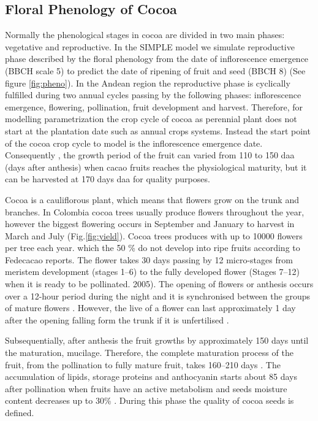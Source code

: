 \documentclass[gene,journal,article,submit,moreauthors,pdftex]{Definitions/mdpi}
\begin{document}
\subsection{Floral Phenology of Cocoa }
Normally the phenological stages in cocoa are  divided in two main phases: vegetative and reproductive. In the SIMPLE model we simulate reproductive phase described by the floral phenology from the date of inflorescence emergence (BBCH scale 5) to predict the date of ripening of fruit and seed (BBCH 8) \citep{Niemenak2010} (See figure \ref{fig:pheno}). In the Andean region the reproductive phase is cyclically fulfilled during two annual cycles passing by the following phases: inflorescence emergence, flowering, pollination, fruit development and harvest. Therefore, for modelling parametrization the crop cycle of cocoa as perennial plant does not start at the plantation date such as annual crops systems. Instead  the start point of the cocoa crop cycle to model is the inflorescence emergence date. Consequently , the growth period of the fruit can varied from  110 to 150  daa (days after anthesis) \citep{lopez2018} when cacao fruits reaches the physiological maturity, but it can be harvested at 170 days daa \citep{Niemenak2010} for quality purposes.

Cocoa is a cauliflorous plant, which means that flowers grow on the trunk and branches. In Colombia cocoa trees usually produce flowers throughout the year, however the biggest flowering occurs in September and January to harvest in March and July (Fig.\ref{fig:yield}). Cocoa trees produces with up to 10000 flowers per tree each year. which the 50 \%  do not develop into ripe fruits according to Fedecacao reports. The flower takes 30 days passing by 12 micro-stages from meristem development (stages 1–6) to the fully developed flower (Stages 7–12) \citep{swanson2005} when it is ready to be pollinated. 2005). The opening of flowers or anthesis  occurs over a 12-hour period during the night and it is synchronised between the groups of mature flowers \citep{Niemenak2010}. However, the live of a flower can last approximately 1 day after the opening falling form the trunk if it is unfertilised \citep{cheesman1927, Niemenak2010}.

Subsequentially, after anthesis the fruit growths by approximately 150 days until the maturation, mucilage. Therefore, the complete maturation process of the fruit, from the pollination to fully mature fruit, takes 160–210 days \cite{berry1994}. The accumulation of lipids, storage proteins and anthocyanin starts about 85 days after pollination when fruits have an active metabolism and seeds   moisture content decreases up to 30\% \cite{Lehrian1980, Niemenak2010}. During this phase the quality of cocoa seeds is defined.\\
 
\end{document}
